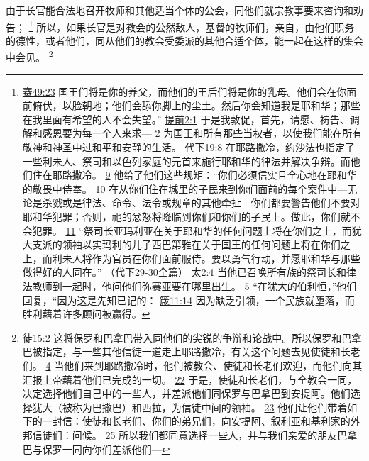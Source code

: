 \documentclass[12pt, a4paper, oneside]{ctexart}
\newcounter{parnum}[section]
\newcommand{\N}{%
   \noindent\refstepcounter{parnum}%
    \makebox[\parindent][l]{\textbf{\arabic{parnum}.}}}
\begin{document}
\N 由于长官能合法地召开牧师和其他适当个体的公会，同他们就宗教事要来咨询和劝告；
	\footnote {
		\href{https://biblehub.com/isaiah/49-23.htm}{赛49:23} 国王们将是你的养父，而他们的王后们将是你的乳母。他们会在你面前俯伏，以脸朝地；他们会舔你脚上的尘土。然后你会知道我是耶和华；那些在我里面有希望的人不会失望。”
		\href{https://biblehub.com/1_timothy/2-1.htm}{提前2:1} 于是我敦促，首先，请愿、祷告、调解和感恩要为每一个人来求---
		\href{https://biblehub.com/1_timothy/2-2.htm}{2} 为国王和所有那些当权者，以使我们能在所有敬神和神圣中过和平和安静的生活。
		\href{https://biblehub.com/2_chronicles/19-8.htm}{代下19:8} 在耶路撒冷，约沙法也指定了一些利未人、祭司和以色列家庭的元首来施行耶和华的律法并解决争辩。而他们住在耶路撒冷。
		\href{https://biblehub.com/2_chronicles/19-9.htm}{9} 他给了他们这些规矩：“你们必须信实且全心地在耶和华的敬畏中侍奉。
		\href{https://biblehub.com/2_chronicles/19-10.htm}{10} 在从你们住在城里的子民来到你们面前的每个案件中---无论是杀戮或是律法、命令、法令或规章的其他牵扯---你们都要警告他们不要对耶和华犯罪；否则，祂的忿怒将降临到你们和你们的子民上。做此，你们就不会犯罪。
		\href{https://biblehub.com/2_chronicles/19-11.htm}{11} “祭司长亚玛利亚在关于耶和华的任何问题上将在你们之上，而犹大支派的领袖以实玛利的儿子西巴第雅在关于国王的任何问题上将在你们之上，而利未人将作为官员在你们面前服侍。要以勇气行动，并愿耶和华与那些做得好的人同在。”
		（\href{https://biblehub.com/niv/2_chronicles/29.htm}{代下29}-\href{https://biblehub.com/niv/2_chronicles/30.htm}{30}全篇）
		\href{https://biblehub.com/matthew/2-4.htm}{太2:4} 当他已召唤所有族的祭司长和律法教师到一起时，他问他们弥赛亚要在哪里出生。
		\href{https://biblehub.com/matthew/2-5.htm}{5} “在犹大的伯利恒，”他们回复，“因为这是先知已记的：
		\href{https://biblehub.com/proverbs/11-14.htm}{箴11:14} 因为缺乏引领，一个民族就堕落，而胜利藉着许多顾问被赢得。
	}
	所以，如果长官是对教会的公然敌人，基督的牧师们，亲自，由他们职务的德性，或者他们，同从他们的教会受委派的其他合适个体，能一起在这样的集会中会见。
	\footnote {
		\href{https://biblehub.com/acts/15-2.htm}{徒15:2} 这将保罗和巴拿巴带入同他们的尖锐的争辩和论战中。所以保罗和巴拿巴被指定，与一些其他信徒一道走上耶路撒冷，有关这个问题去见使徒和长老们。
		\href{https://biblehub.com/acts/15-4.htm}{4} 当他们来到耶路撒冷时，他们被教会、使徒和长老们欢迎，而他们向其汇报上帝藉着他们已完成的一切。
		\href{https://biblehub.com/acts/15-22.htm}{22} 于是，使徒和长老们，与全教会一同，决定选择他们自己中的一些人，并差派他们同保罗与巴拿巴到安提阿。他们选择犹大（被称为巴撒巴）和西拉，为信徒中间的领袖。
		\href{https://biblehub.com/acts/15-23.htm}{23} 他们让他们带着如下的一封信：使徒和长老们、你们的弟兄们，向安提阿、叙利亚和基利家的外邦信徒们：问候。
		\href{https://biblehub.com/acts/15-25.htm}{25} 所以我们都同意选择一些人，并与我们亲爱的朋友巴拿巴与保罗一同向你们差派他们---
	}
\end{document}
